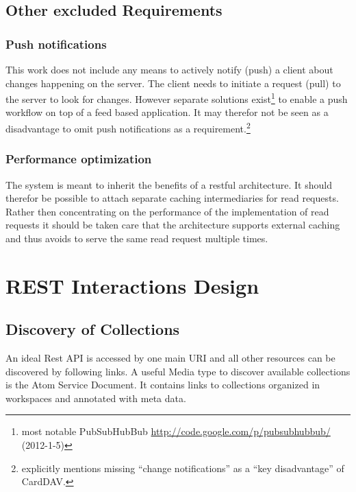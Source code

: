 \documentclass[12pt,a4paper,twoside]{scrartcl}		%
\newcommand{\citeurl}[2]{\url{#1} (#2)}
\begin{document}
\subsection{Other excluded Requirements}
\label{sec:other-excl-requ}

\subsubsection{Push notifications} %
This work does not include any means to actively notify (push) a client about
changes happening on the server. The client needs to initiate a request (pull)
to the server to look for changes. However separate solutions
exist\footnote{most notable PubSubHubBub
  \citeurl{http://code.google.com/p/pubsubhubbub/}{2012-1-5}} to enable a push
workflow on top of a feed based
application\cite{Wilde:2009:FQP:1693155.1693220}. It may therefor not be seen as
a disadvantage to omit push notifications as a
requirement.\footnote{\cite[sec. 1]{RFC6352} explicitly mentions missing
  ``change notifications'' as a ``key disadvantage'' of CardDAV.}

\subsubsection{Performance optimization}
The system is meant to inherit the benefits of a restful architecture. It should
therefor be possible to attach separate caching intermediaries for read
requests. Rather then concentrating on the performance of the implementation of
read requests it should be taken care that the architecture supports external
caching and thus avoids to serve the same read request multiple times.


\section{REST Interactions Design}
\label{sec:interactions}
\subsection{Discovery of Collections}
\label{sec:disc-coll}

An ideal Rest API is accessed by one main URI and all other resources can be
discovered by following links. A useful Media type to discover available
collections is the Atom Service Document\cite[sec. 8]{RFC5023}. It contains
links to collections organized in workspaces and annotated with meta data.
\end{document}
